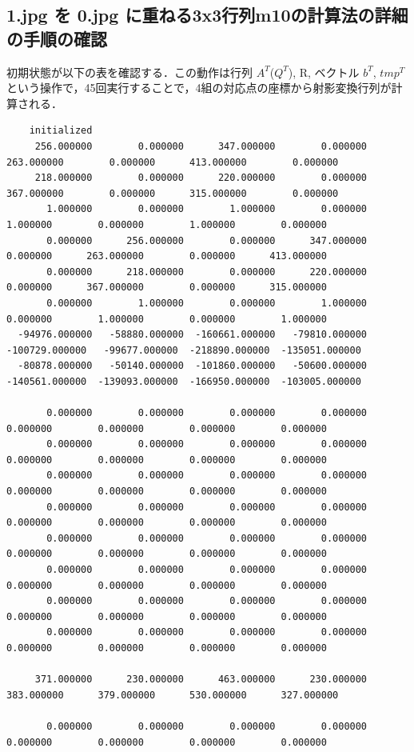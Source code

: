 \documentclass[11pt]{jarticle}
\begin{document}
\subsection{1.jpg を 0.jpg に重ねる3x3行列m10の計算法の詳細の手順の確認}
初期状態が以下の表を確認する．この動作は行列 $A^{T}$($Q^{T}$), R, ベクトル $b^{T}$, $tmp^{T}$という操作で，45回実行することで，4組の対応点の座標から射影変換行列が計算される．
\tiny
\begin{verbatim}
    initialized
     256.000000        0.000000      347.000000        0.000000      263.000000        0.000000      413.000000        0.000000 
     218.000000        0.000000      220.000000        0.000000      367.000000        0.000000      315.000000        0.000000 
       1.000000        0.000000        1.000000        0.000000        1.000000        0.000000        1.000000        0.000000 
       0.000000      256.000000        0.000000      347.000000        0.000000      263.000000        0.000000      413.000000 
       0.000000      218.000000        0.000000      220.000000        0.000000      367.000000        0.000000      315.000000 
       0.000000        1.000000        0.000000        1.000000        0.000000        1.000000        0.000000        1.000000 
  -94976.000000   -58880.000000  -160661.000000   -79810.000000  -100729.000000   -99677.000000  -218890.000000  -135051.000000 
  -80878.000000   -50140.000000  -101860.000000   -50600.000000  -140561.000000  -139093.000000  -166950.000000  -103005.000000 

       0.000000        0.000000        0.000000        0.000000        0.000000        0.000000        0.000000        0.000000 
       0.000000        0.000000        0.000000        0.000000        0.000000        0.000000        0.000000        0.000000 
       0.000000        0.000000        0.000000        0.000000        0.000000        0.000000        0.000000        0.000000 
       0.000000        0.000000        0.000000        0.000000        0.000000        0.000000        0.000000        0.000000 
       0.000000        0.000000        0.000000        0.000000        0.000000        0.000000        0.000000        0.000000 
       0.000000        0.000000        0.000000        0.000000        0.000000        0.000000        0.000000        0.000000 
       0.000000        0.000000        0.000000        0.000000        0.000000        0.000000        0.000000        0.000000 
       0.000000        0.000000        0.000000        0.000000        0.000000        0.000000        0.000000        0.000000 

     371.000000      230.000000      463.000000      230.000000      383.000000      379.000000      530.000000      327.000000 

       0.000000        0.000000        0.000000        0.000000        0.000000        0.000000        0.000000        0.000000 
\end{verbatim}
\end{document}
